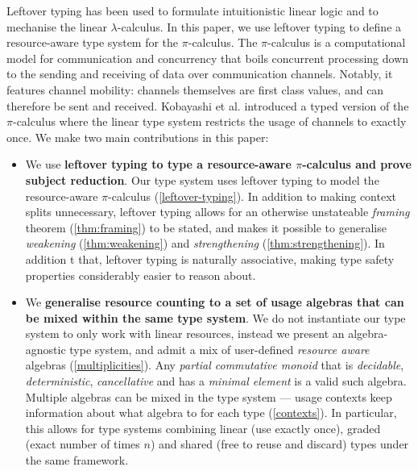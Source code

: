 \documentclass[]{llncs}
\newcommand{\lambdacalc}{$\lambda$-calculus}
\newcommand{\picalc}{$\pi$-calculus}
\begin{document}
Leftover typing has been used to formulate intuitionistic linear logic \cite{Mackie} and to mechanise the linear \lambdacalc \cite{Allais2018a}.
In this paper, we use leftover typing to define a resource-aware type system for the \picalc{}.
The \picalc{} \cite{MilnerPW92,Milner99} is a computational model for communication and concurrency that boils concurrent processing down to the sending and receiving of data over communication channels.
Notably, it features channel mobility: channels themselves are first class values, and can therefore be sent and received.
Kobayashi et al. \cite{KPT96} introduced a typed version of the \picalc{} where the linear type system restricts the usage of channels to exactly once.
We make two main contributions in this paper:
\begin{itemize}
  \item We use \textbf{leftover typing to type a resource-aware \picalc{} and prove subject reduction}.
    Our type system uses leftover typing to model the resource-aware \picalc{} (\autoref{leftover-typing}).
    In addition to making context splits unnecessary, leftover typing allows for an otherwise unstateable \emph{framing} theorem (\autoref{thm:framing}) to be stated, and makes it possible to generalise \emph{weakening} (\autoref{thm:weakening}) and \emph{strengthening} (\autoref{thm:strengthening}).
    In addition t that, leftover typing is naturally associative, making type safety properties considerably easier to reason about.
    
  \item We \textbf{generalise resource counting to a set of usage algebras that can be mixed within the same type system}.
    We do not instantiate our type system to only work with linear resources, instead we present an algebra-agnostic type system, and admit a mix of user-defined \emph{resource aware} algebras (\autoref{multiplicities}).
    Any \emph{partial commutative monoid} that is \emph{decidable}, \emph{deterministic}, \emph{cancellative} and has a \emph{minimal element} is a valid such algebra.
    Multiple algebras can be mixed in the type system --- usage contexts keep information about what algebra to for each type (\autoref{contexts}).
    In particular, this allows for type systems combining linear (use exactly once), graded (exact number of times $n$) and shared (free to reuse and discard) types under the same framework.
\end{itemize}
\end{document}
